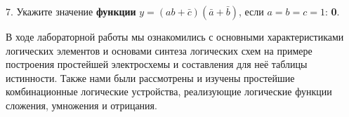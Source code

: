 \documentclass[spec, och, otchet, hidelinks]{SCWorks}
\begin{document}
7. Укажите значение \textbf{функции} $ y = (ab + \bar c)(\bar a + \bar b) $, если $ a = b = c = 1 $: \textbf{0}.

\newpage

\conclusion

\par В ходе лабораторной работы мы ознакомились с основными характеристиками логических элементов и 
основами синтеза логических схем на примере построения простейшей электросхемы и составления для неё 
таблицы истинности. Также нами были рассмотрены и изучены простейшие комбинационные логические устройства,
реализующие логические функции сложения, умножения и отрицания.

\newpage
\end{document}
